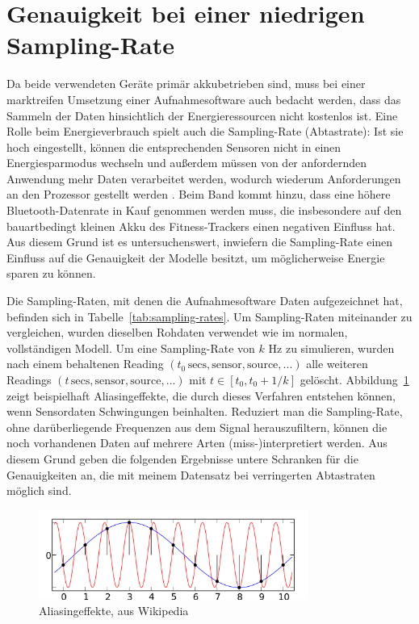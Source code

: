 \section{Genauigkeit bei einer niedrigen Sampling-Rate}
\label{sec:lower-sampling-rate}
Da beide verwendeten Geräte primär akkubetrieben sind, muss bei einer marktreifen Umsetzung einer Aufnahmesoftware auch bedacht werden, dass das Sammeln der Daten hinsichtlich der Energieressourcen nicht kostenlos ist. Eine Rolle beim Energieverbrauch spielt auch die Sampling-Rate (Abtastrate): Ist sie hoch eingestellt, können die entsprechenden Sensoren nicht in einen Energiesparmodus wechseln und außerdem müssen von der anfordernden Anwendung mehr Daten verarbeitet werden, wodurch wiederum Anforderungen an den Prozessor gestellt werden \cite{Krause2005}. Beim Band kommt hinzu, dass eine höhere Bluetooth-Datenrate in Kauf genommen werden muss, die insbesondere auf den bauartbedingt kleinen Akku des Fitness-Trackers einen negativen Einfluss hat. Aus diesem Grund ist es untersuchenswert, inwiefern die Sampling-Rate einen Einfluss auf die Genauigkeit der Modelle besitzt, um möglicherweise Energie sparen zu können.

Die Sampling-Raten, mit denen die Aufnahmesoftware Daten aufgezeichnet hat, befinden sich in Tabelle~\ref{tab:sampling-rates}. Um Sampling-Raten miteinander zu vergleichen, wurden dieselben Rohdaten verwendet wie im normalen, vollständigen Modell. Um eine Sampling-Rate von $k$ Hz zu simulieren, wurden nach einem behaltenen Reading $(t_0\,\text{secs}, \text{sensor}, \text{source}, ...)$ alle weiteren Readings $(t\,\text{secs}, \text{sensor}, \text{source}, ...)$ mit $t \in [t_0, t_0 + 1/k]$ gelöscht. Abbildung~\ref{fig:aliasing} zeigt beispielhaft Aliasingeffekte, die durch dieses Verfahren entstehen können, wenn Sensordaten Schwingungen beinhalten. Reduziert man die Sampling-Rate, ohne darüberliegende Frequenzen aus dem Signal herauszufiltern, können die noch vorhandenen Daten auf mehrere Arten (miss-)interpretiert werden. Aus diesem Grund geben die folgenden Ergebnisse untere Schranken für die Genauigkeiten an, die mit meinem Datensatz bei verringerten Abtastraten möglich sind.

\begin{figure}
\centering
\includegraphics[width=250pt]{img/aliasing}
\caption{Aliasingeffekte, aus Wikipedia \cite{Moxfyre2009Aliasing}}
\label{fig:aliasing}
\end{figure}

